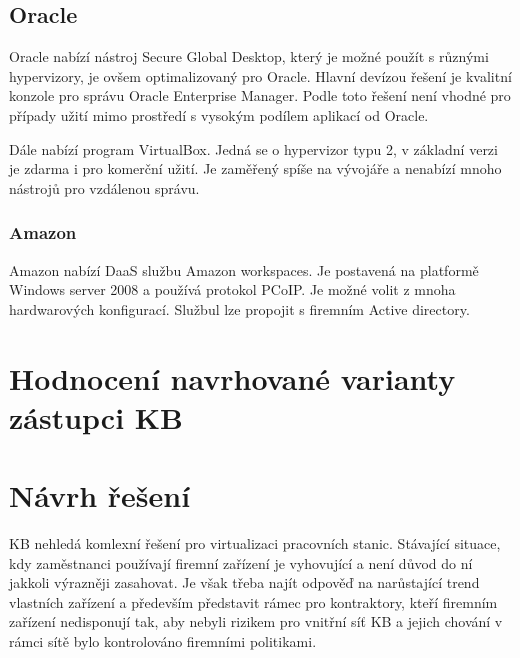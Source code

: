 \subsection{Oracle}
Oracle nabízí nástroj Secure Global Desktop, který je možné použít s různými hypervizory, je ovšem optimalizovaný pro Oracle. Hlavní devízou řešení je kvalitní konzole pro správu Oracle Enterprise Manager. Podle  toto řešení není vhodné pro případy užití mimo prostředí s vysokým podílem aplikací od Oracle.

Dále nabízí program VirtualBox. Jedná se o hypervizor typu 2, v základní verzi je zdarma i pro komerční užití. Je zaměřený spíše na vývojáře a nenabízí mnoho nástrojů pro vzdálenou správu. 

\subsubsection{Amazon}

Amazon nabízí DaaS službu Amazon workspaces. Je postavená na platformě Windows server 2008 a používá protokol PCoIP. Je možné volit z mnoha hardwarových konfigurací. Službul lze propojit s firemním Active directory. 


\section{Hodnocení navrhované varianty zástupci KB}




\section{Návrh řešení}

KB nehledá komlexní řešení pro virtualizaci pracovních stanic. Stávající situace, kdy zaměstnanci používají firemní zařízení je vyhovující a není důvod do ní jakkoli výrazněji zasahovat. Je však třeba najít odpověď na narůstající trend vlastních zařízení a především představit rámec pro kontraktory, kteří firemním zařízení nedisponují tak, aby nebyli rizikem pro vnitřní síť KB a jejich chování v rámci sítě bylo kontrolováno firemními politikami.

